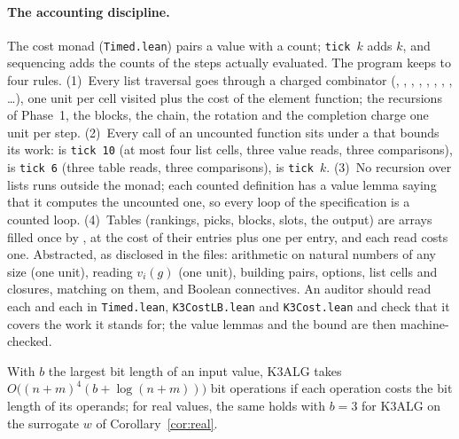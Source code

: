 \documentclass[runningheads,11pt]{llncs}
\begin{document}
\paragraph{The accounting discipline.} The cost monad  (\texttt{Timed.lean}) pairs a value with a count; \texttt{tick~$k$} adds $k$, and sequencing adds the counts of the steps actually evaluated. The program keeps to four rules. (1)~Every list traversal goes through a charged combinator (, , , , , , , , \dots), one unit per cell visited plus the cost of the element function; the recursions of Phase~1, the blocks, the chain, the rotation and the completion charge one unit per step. (2)~Every call of an uncounted function sits under a  that bounds its work:  is \texttt{tick 10} (at most four list cells, three value reads, three comparisons),  is \texttt{tick 6} (three table reads, three comparisons),  is \texttt{tick~$k$}. (3)~No recursion over lists runs outside the monad; each counted definition has a value lemma saying that it computes the uncounted one, so every loop of the specification is a counted loop. (4)~Tables (rankings, picks, blocks, slots, the output) are arrays filled once by , at the cost of their entries plus one per entry, and each read costs one. Abstracted, as disclosed in the files: arithmetic on natural numbers of any size (one unit), reading $v_i(g)$ (one unit), building pairs, options, list cells and closures, matching on them, and Boolean connectives. An auditor should read each  and each  in \texttt{Timed.lean}, \texttt{K3CostLB.lean} and \texttt{K3Cost.lean} and check that it covers the work it stands for; the value lemmas and the bound are then machine-checked.

\begin{corollary}\label{cor:bits}
With $b$ the largest bit length of an input value, K3ALG takes $O\big((n+m)^4(b+\log(n+m))\big)$ bit operations if each operation costs the bit length of its operands; for real values, the same holds with $b=3$ for K3ALG on the surrogate $w$ of Corollary~\ref{cor:real}.
\end{corollary}
\end{document}
